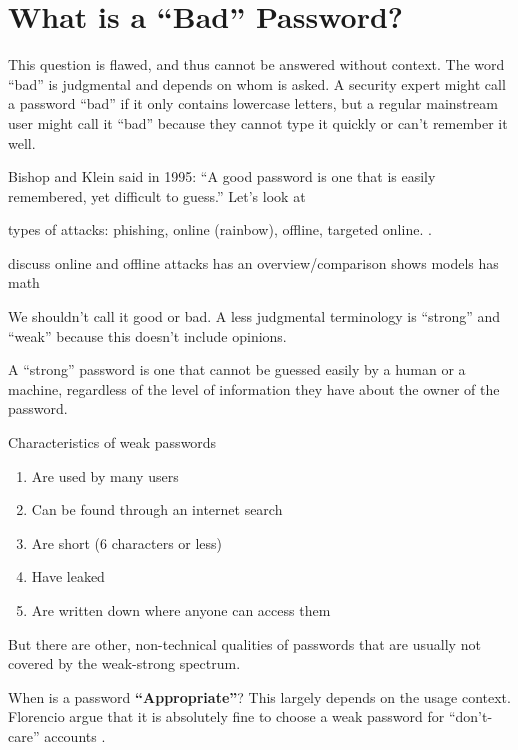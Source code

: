 \section{What is a ``Bad'' Password?}
This question is flawed, and thus cannot be answered without context. The word ``bad'' is judgmental and depends on whom is asked. A security expert might call a password ``bad'' if it only contains lowercase letters, but a regular mainstream user might call it ``bad'' because they cannot type it quickly or can't remember it well. 

Bishop and Klein said in 1995: ``A good password is one that is easily remembered, yet difficult to guess.'' \cite[p. 231]{Bishop1995ProactivePasswordChecking}
Let's look at 

types of attacks: phishing, online (rainbow), offline, targeted online. \cite{ZhangKennedy2016RevisitingPasswordRules}. 

discuss online and offline attacks
\cite{Wang2016fuzzyPWM} has an overview/comparison
\cite{Florencio2014AdministratorsGuide} shows models
\cite{Florencio2014PasswordPortfoliosFiniteUser} has math

We shouldn't call it good or bad. A less judgmental terminology is ``strong'' and ``weak'' because this doesn't include opinions. 

A ``strong'' password is one that cannot be guessed easily by a human or a machine, regardless of the level of information they have about the owner of the password. 

Characteristics of weak passwords \cite{Burnett2005PerfectPasswords}
\begin{enumerate}
	\item Are used by many users
	\item Can be found through an internet search
	\item Are short (6 characters or less)
	\item Have leaked
	\item Are written down where anyone can access them
\end{enumerate}

But there are other, non-technical qualities of passwords that are usually not covered by the weak-strong spectrum. 

When is a password \textbf{``Appropriate''}? This largely depends on the usage context. \cite{Gaw2005ReuseRecycle, Haque2014Hierarchy}
Florencio \etal argue that it is absolutely fine to choose a weak password for ``don't-care'' accounts \cite{Florencio2014}.

